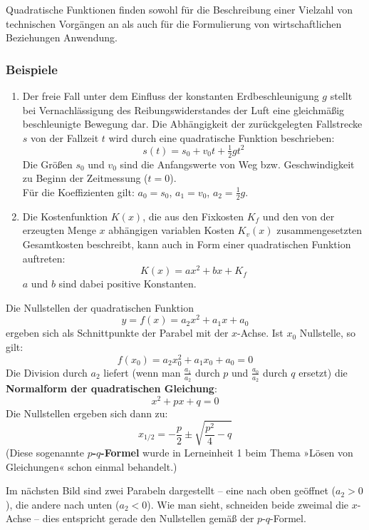 Quadratische Funktionen finden sowohl für die Beschreibung einer Vielzahl von technischen Vorgängen an als auch für die Formulierung von wirtschaftlichen Beziehungen Anwendung.

\subsubsection{Beispiele}

\begin{enumerate}[label=\alph*)]
  \item Der freie Fall unter dem Einfluss der konstanten Erdbeschleunigung $g$ stellt bei Vernachlässigung des Reibungswiderstandes der Luft eine gleichmäßig beschleunigte Bewegung dar. Die Abhängigkeit der zurückgelegten Fallstrecke $s$ von der Fallzeit $t$ wird durch eine quadratische Funktion beschrieben:
    \[ s(t) = s_0 + v_0 t + \tfrac{1}{2} g t^2 \]
    Die Größen $s_0$ und $v_0$ sind die Anfangswerte von Weg bzw. Geschwindigkeit zu Beginn der Zeitmessung ($t = 0$).\\
    Für die Koeffizienten gilt: $a_0 = s_0$, $a_1 = v_0$, $a_2 = \tfrac{1}{2} g$.
  \item Die Kostenfunktion $K(x)$, die aus den Fixkosten $K_f$ und den von der erzeugten Menge $x$ abhängigen variablen Kosten $K_v(x)$ zusammengesetzten Gesamtkosten beschreibt, kann auch in Form einer quadratischen Funktion auftreten:
    \[ K(x) = a x^2 + b x + K_f \]
    $a$ und $b$ sind dabei positive Konstanten.\beispielende
\end{enumerate}

Die Nullstellen der quadratischen Funktion
\[ y = f(x) = a_2 x^2 + a_1 x + a_0 \]
ergeben sich als Schnittpunkte der Parabel mit der $x$-Achse. Ist $x_0$ Nullstelle, so gilt:
\[ f(x_0) = a_2 x_0^2 + a_1 x_0 + a_0 = 0 \]
Die Division durch $a_2$ liefert (wenn man $\tfrac{a_1}{a_2}$ durch $p$ und $\tfrac{a_0}{a_2}$ durch $q$ ersetzt) die \textbf{Normalform der quadratischen Gleichung}:
\[ x^2 + p x + q = 0 \]
Die Nullstellen ergeben sich dann zu:
\[ x_{1/2} = -\frac{p}{2} \pm \sqrt{\frac{p^2}{4} - q} \]
(Diese sogenannte \textbf{$p$-$q$-Formel} wurde in Lerneinheit 1 beim Thema »Lösen von Gleichungen« schon einmal behandelt.)

Im nächsten Bild sind zwei Parabeln dargestellt -- eine nach oben geöffnet ($a_2 > 0$), die andere nach unten ($a_2 < 0$). Wie man sieht, schneiden beide zweimal die $x$-Achse -- dies entspricht gerade den Nullstellen gemäß der $p$-$q$-Formel.

\begin{center}
\end{center}


